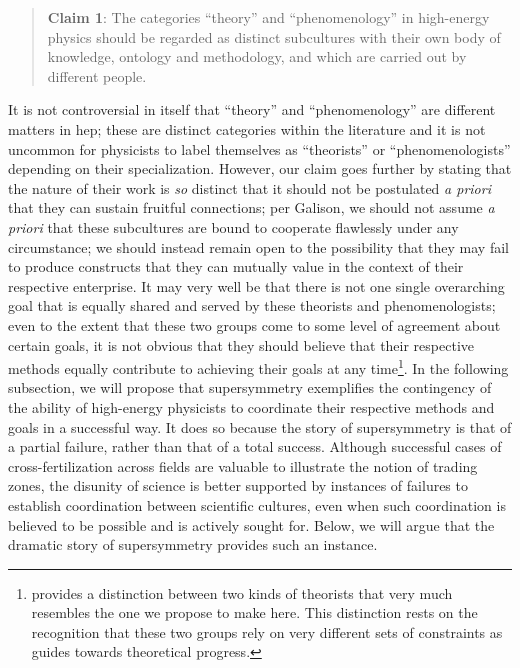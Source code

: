 \documentclass[smallextended]{svjour3}
\begin{document}
\begin{quote}
    \textbf{Claim 1}: The categories ``theory'' and ``phenomenology'' in high-energy physics should be regarded as distinct subcultures with their own body of knowledge, ontology and methodology, and which are carried out by different people.
\end{quote}

 It is not controversial in itself that ``theory'' and ``phenomenology'' are different matters in \gls{hep}; these are distinct categories within the literature and it is not uncommon for physicists to label themselves as ``theorists'' or ``phenomenologists'' depending on their specialization. However, our claim goes further by stating that the nature of their work is \textit{so} distinct that it should not be postulated \textit{a priori} that they can sustain fruitful connections; per Galison, we should not assume \textit{a priori} that these subcultures are bound to cooperate flawlessly under any circumstance; we should instead remain open to the possibility that they may fail to produce constructs that they can mutually value in the context of their respective enterprise. It may very well be that there is not one single overarching goal that is equally shared and served by these theorists and phenomenologists; even to the extent that these two groups come to some level of agreement about certain goals, it is not obvious that they should believe that their respective methods equally contribute to achieving their goals at any time\footnote{\citealt{Galison1995} provides a distinction between two kinds of theorists that very much resembles the one we propose to make here. This distinction rests on the recognition that these two groups rely on very different sets of constraints as guides towards theoretical progress.}. In the following subsection, we will propose that supersymmetry exemplifies the contingency of the ability of high-energy physicists to coordinate their respective methods and goals in a successful way. It does so because the story of supersymmetry is that of a partial failure, rather than that of a total success. Although successful cases of cross-fertilization across fields are valuable to illustrate the notion of trading zones, the disunity of science is better supported by instances of failures to establish coordination between scientific cultures, even when such coordination is believed to be possible and is actively sought for. Below, we will argue that the dramatic story of supersymmetry provides such an instance.
\end{document}
